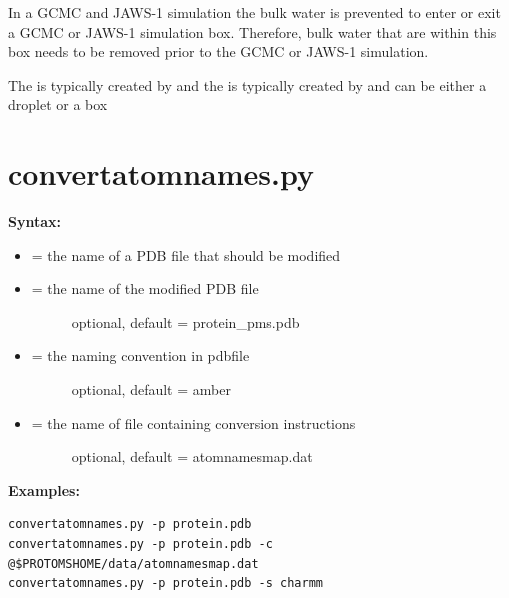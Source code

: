\documentclass[letterpaper,10pt,english]{manual}
\begin{document}
In a GCMC and JAWS-1 simulation the bulk water is prevented to enter or exit a GCMC or JAWS-1 simulation box. Therefore, bulk water that are within this box needs to be removed prior to the GCMC or JAWS-1 simulation.

The  is typically created by  and the  is typically created by  and can be either a droplet or a box


\section{convertatomnames.py}

\textbf{Syntax:}

\begin{itemize}
\item {} 
 = the name of a PDB file that should be modified

\item {} \begin{description}
\item[{ = the name of the modified PDB file}] \leavevmode
optional, default = protein\_pms.pdb

\end{description}

\item {} \begin{description}
\item[{ = the naming convention in pdbfile}] \leavevmode
optional, default = amber

\end{description}

\item {} \begin{description}
\item[{ = the name of file containing conversion instructions}] \leavevmode
optional, default = atomnamesmap.dat

\end{description}

\end{itemize}

\textbf{Examples:}

\begin{Verbatim}[commandchars=@\[\]]
convertatomnames.py -p protein.pdb
convertatomnames.py -p protein.pdb -c @$PROTOMSHOME/data/atomnamesmap.dat
convertatomnames.py -p protein.pdb -s charmm
\end{Verbatim}
\end{document}
